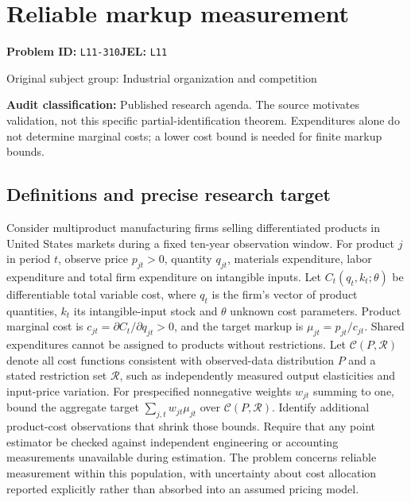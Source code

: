 \documentclass[11pt,a4paper]{article}
\begin{document}
\section*{Reliable markup measurement}
\textbf{Problem ID:} \texttt{L11-310}\quad \textbf{JEL:} \texttt{L11}\par
\label{problem:OP-0391}
\label{audited:ECON-032}
\label{audited:ECON-035}
{\sffamily\small\color{muted}Original subject group: Industrial organization and competition\par}
\label{definitions:problem:30007673}
\textbf{Audit classification:} Published research agenda. The source motivates validation, not this specific partial-identification theorem. Expenditures alone do not determine marginal costs; a lower cost bound is needed for finite markup bounds.
\subsection*{Definitions and precise research target}
Consider multiproduct manufacturing firms selling differentiated products in United States markets during a fixed ten-year observation window. For product \(j\) in period \(t\), observe price \(p_{jt}>0\), quantity \(q_{jt}\), materials expenditure, labor expenditure and total firm expenditure on intangible inputs. Let \(C_t(q_t,k_t;\theta)\) be differentiable total variable cost, where \(q_t\) is the firm's vector of product quantities, \(k_t\) its intangible-input stock and \(\theta\) unknown cost parameters. Product marginal cost is \(c_{jt}=\partial C_t/\partial q_{jt}>0\), and the target markup is \(\mu_{jt}=p_{jt}/c_{jt}\). Shared expenditures cannot be assigned to products without restrictions. Let \(\mathcal C(P,\mathcal R)\) denote all cost functions consistent with observed-data distribution \(P\) and a stated restriction set \(\mathcal R\), such as independently measured output elasticities and input-price variation. For prespecified nonnegative weights \(w_{jt}\) summing to one, bound the aggregate target \(\sum_{j,t}w_{jt}\mu_{jt}\) over \(\mathcal C(P,\mathcal R)\). Identify additional product-cost observations that shrink those bounds. Require that any point estimator be checked against independent engineering or accounting measurements unavailable during estimation. The problem concerns reliable measurement within this population, with uncertainty about cost allocation reported explicitly rather than absorbed into an assumed pricing model.
\end{document}
